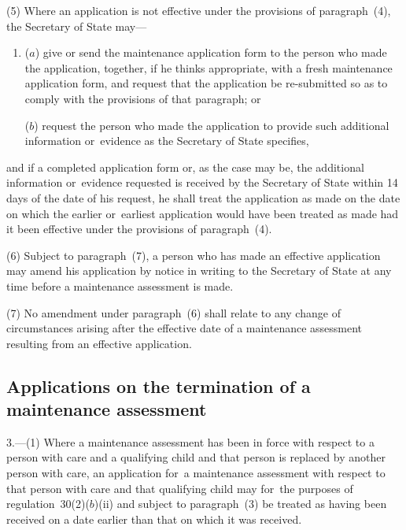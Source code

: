 \documentclass[a4paper,12pt]{article}
\begin{document}
(5) Where an application is not effective under the provisions of paragraph~(4), the Secretary of State may—
\begin{enumerate}\item[]
($a$) give or send the maintenance application form to the person who made the application, together, if he thinks appropriate, with a fresh maintenance application form, and request that the application be re-submitted so as to comply with the provisions of that paragraph; or

($b$) request the person who made the application to provide such additional information or~evidence as the Secretary of State specifies,
\end{enumerate}
and if a completed application form or, as the case may be, the additional information or~evidence requested is received by the Secretary of State within 14 days of the date of his request, he shall treat the application as made on the date on which the earlier or~earliest application would have been treated as made had it been effective under the provisions of paragraph~(4).

(6) Subject to paragraph~(7), a person who has made an effective application may amend his application by notice in writing to the Secretary of State at any time before a maintenance assessment is made.

(7) No amendment under paragraph~(6) shall relate to any change of circumstances arising after the effective date of a maintenance assessment resulting from an effective application.


\subsection[3. Applications on the termination of a maintenance assessment]{Applications on the termination of a maintenance assessment}

3.—(1) Where a maintenance assessment has been in force with respect to a person with care and a qualifying child and that person is replaced by another person with care, an application for~a maintenance assessment with respect to that person with care and that qualifying child may for~the purposes of regulation~30(2)($b$)(ii) and subject to paragraph~(3) be treated as having been received on a date earlier than that on which it was received.
\end{document}
